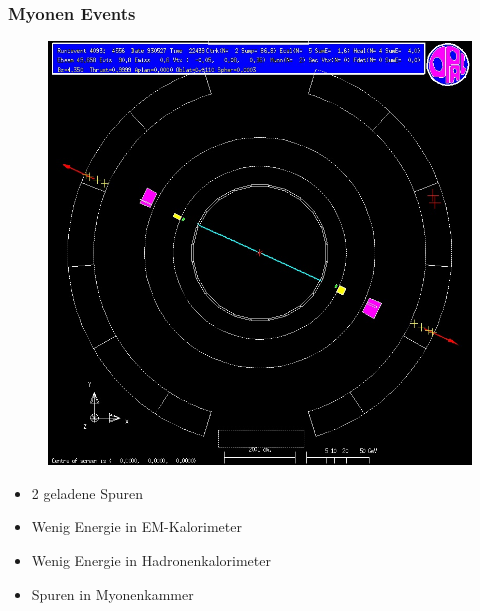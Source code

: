 \begin{frame}
	\frametitle{Myonen Events}
		\begin{minipage}{0.54\linewidth}
			\begin{figure}
				\centering
				\includegraphics[width=1.0\linewidth]{graphics/muonopal}
			\end{figure}
		\end{minipage}
		\begin{minipage}{0.44\linewidth}
			\begin{center}
				\begin{itemize}
					\item 2 geladene Spuren\\\hfill
					\item Wenig Energie in EM-Kalorimeter\\\hfill
					\item Wenig Energie in Hadronenkalorimeter\\\hfill
					\item Spuren in Myonenkammer
				\end{itemize}
			\end{center}
		\end{minipage}
\end{frame}

